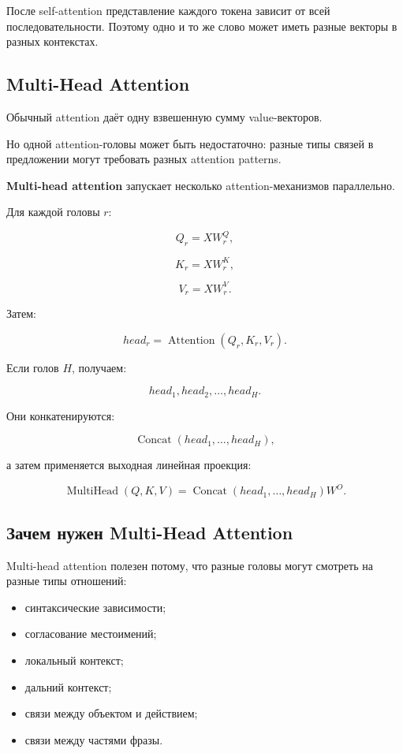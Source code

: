 \documentclass[a4paper,12pt]{article}
\begin{document}
После self-attention представление каждого токена зависит от всей последовательности. Поэтому одно и то же слово может иметь разные векторы в разных контекстах.

\subsection{Multi-Head Attention}

Обычный attention даёт одну взвешенную сумму value-векторов.

Но одной attention-головы может быть недостаточно: разные типы связей в предложении могут требовать разных attention patterns.

\textbf{Multi-head attention} запускает несколько attention-механизмов параллельно.

Для каждой головы \(r\):

\[
Q_r = XW_r^Q,
\]

\[
K_r = XW_r^K,
\]

\[
V_r = XW_r^V.
\]

Затем:

\[
head_r
=
\operatorname{Attention}(Q_r,K_r,V_r).
\]

Если голов \(H\), получаем:

\[
head_1, head_2, \dots, head_H.
\]

Они конкатенируются:

\[
\operatorname{Concat}(head_1,\dots,head_H),
\]

а затем применяется выходная линейная проекция:

\[
\operatorname{MultiHead}(Q,K,V)
=
\operatorname{Concat}(head_1,\dots,head_H)W^O.
\]

\subsection{Зачем нужен Multi-Head Attention}

Multi-head attention полезен потому, что разные головы могут смотреть на разные типы отношений:

\begin{itemize}
    \item синтаксические зависимости;
    \item согласование местоимений;
    \item локальный контекст;
    \item дальний контекст;
    \item связи между объектом и действием;
    \item связи между частями фразы.
\end{itemize}
\end{document}
